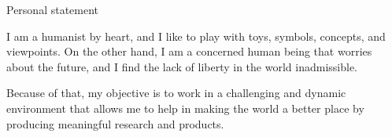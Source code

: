 \begin{rubric}{Personal statement}{

  \entry*

  I am a humanist by heart, and I like to play with toys, symbols,
  concepts, and viewpoints. On the other hand, I am a concerned human
  being that worries about the future, and I find the lack of liberty in
  the world inadmissible.

  Because of that, my objective is to work in a challenging and
  dynamic environment that allows me to help in making the world a
  better place by producing meaningful research and products.
}
\end{rubric}
